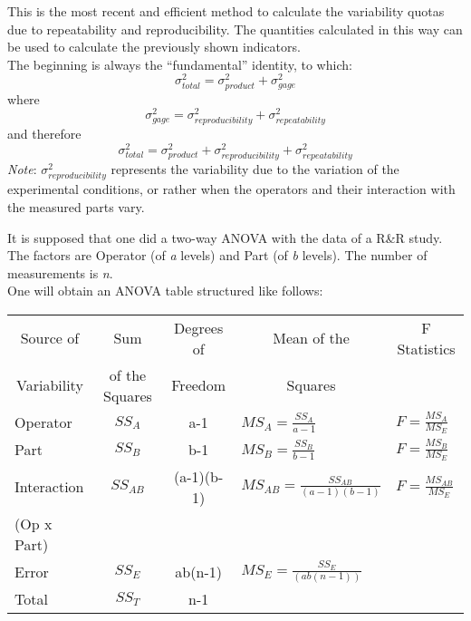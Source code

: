 
\begin{frame}
This is the most recent and efficient method to calculate the variability quotas due to repeatability and reproducibility. The quantities calculated in this way can be used to calculate the previously shown indicators.\\
The beginning is always the ``fundamental'' identity, to which:
$$\sigma^{2}_{total}=\sigma^{2}_{product}+\sigma^{2}_{gage}$$
where
$$\sigma^{2}_{gage}=\sigma^{2}_{reproducibility}+\sigma^{2}_{repeatability}$$
and therefore
$$\sigma^{2}_{total}=\sigma^{2}_{product}+\sigma^{2}_{reproducibility}+\sigma^{2}_{repeatability}$$
\textit{Note}: $\sigma^{2}_{reproducibility}$ represents the variability due to the variation of the experimental conditions, or rather when the operators and their interaction with the measured parts vary. 
\end{frame}

\begin{frame}
\begin{small}\vspace*{.25cm}
It is supposed that one did a two-way ANOVA with the data of a R\&R study. The factors are Operator (of \textit{a} levels) and Part (of \textit{b} levels). The number of measurements is \textit{n}.\\
One will obtain an ANOVA table structured like follows:\\
\begin{center}
\begin{tabular}{|l|c|c|l|l|}
\hline
\multicolumn{1}{|c|}{Source of} & Sum  & Degrees of  & \multicolumn{1}{|c|}{Mean of the} & \multicolumn{1}{|c|}{F Statistics} \\
\multicolumn{1}{|c|}{Variability} & of the Squares & Freedom & \multicolumn{1}{|c|}{ Squares} & \multicolumn{1}{|c|}{} \\
\hline
Operator & $SS_A$ & a-1 & $MS_{A}=\frac{SS_A}{a-1}$ & $F=\frac{MS_A}{MS_E}$\\
\hline
Part & $SS_B$ & b-1 & $MS_B=\frac{SS_B}{b-1}$ & $F=\frac{MS_B}{MS_E}$\\
\hline
Interaction & $SS_{AB}$ & (a-1)(b-1) & $MS_{AB}=\frac{SS_{AB}}{(a-1)(b-1)}$ & $F=\frac{MS_{AB}}{MS_{E}}$\\
(Op x Part) &  &  &  & \\
\hline
Error & $SS_{E}$ & ab(n-1) & $MS_{E}=\frac{SS_{E}}{(ab(n-1))}$ & \\
\hline
Total & $SS_{T}$ & n-1 &  & \\
\hline
\end{tabular}\\
\end{center}            \end{small}
\end{frame}

